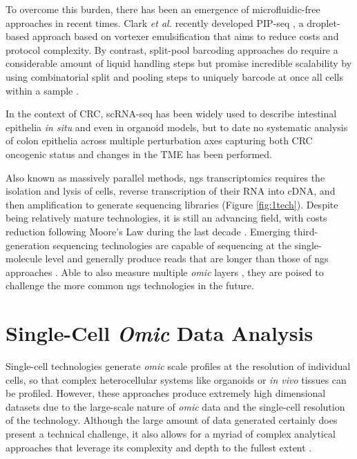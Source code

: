 To overcome this burden, there has been an emergence of microfluidic-free approaches in recent times. Clark \textit{et al.} recently developed PIP-seq \cite{clark_microfluidics-free_2023}, a droplet-based approach based on vortexer emulsification that aims to reduce costs and protocol complexity. By contrast, split-pool barcoding approaches do require a considerable amount of liquid handling steps but promise incredible scalability by using combinatorial split and pooling steps to uniquely barcode at once all cells within a sample \cite{rosenberg_single-cell_2018}.

In the context of CRC, scRNA-seq has been widely used to describe intestinal epithelia \emph{in situ} \cite{haber_single-cell_2017} and even in organoid models, but to date no systematic analysis of colon epithelia across multiple perturbation axes capturing both CRC oncogenic status and changes in the TME has been performed. 

Also known as massively parallel methods, \acrshort{ngs} transcriptomics requires the isolation and lysis of cells, reverse transcription of their RNA into cDNA, and then amplification to generate sequencing libraries (Figure \ref{fig:1tech}). Despite being relatively mature technologies, it is still an advancing field, with costs reduction following Moore's Law during the last decade \cite{wetterstrand_dna_2022}.
Emerging third-generation sequencing technologies \cite{check_hayden_genome_2009} are capable of sequencing at the single-molecule level and generally produce reads that are longer than those of \acrshort{ngs} approaches \cite{eid_real-time_2009,deamer_three_2016}. Able to also measure multiple \emph{omic} layers \cite{ni_deepsignal_2019}, they are poised to challenge the more common \acrshort{ngs} technologies in the future.

\newpage
\section{Single-Cell \emph{Omic} Data Analysis}

Single-cell technologies generate \emph{omic} scale profiles at the resolution of individual cells, so that complex heterocellular systems like organoids or \textit{in vivo} tissues can be profiled.
However, these approaches produce extremely high dimensional datasets due to the large-scale nature of \emph{omic} data and the single-cell resolution of the technology. Although the large amount of data generated certainly does present a technical challenge, it also allows for a myriad of complex analytical approaches that leverage its complexity and depth to the fullest extent \cite{mincarelli_defining_2018,qin_deciphering_2020}. 


